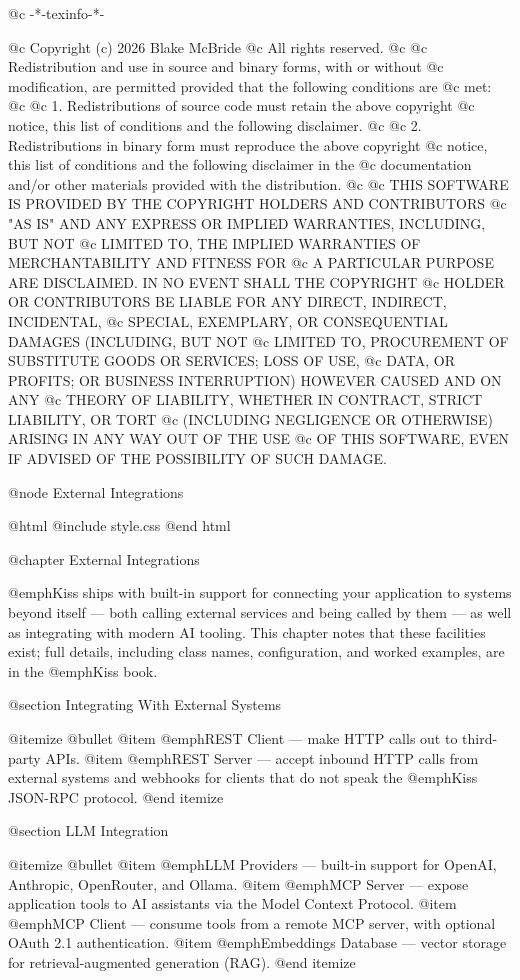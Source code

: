 @c -*-texinfo-*-

@c  Copyright (c) 2026 Blake McBride
@c  All rights reserved.
@c
@c  Redistribution and use in source and binary forms, with or without
@c  modification, are permitted provided that the following conditions are
@c  met:
@c
@c  1. Redistributions of source code must retain the above copyright
@c  notice, this list of conditions and the following disclaimer.
@c
@c  2. Redistributions in binary form must reproduce the above copyright
@c  notice, this list of conditions and the following disclaimer in the
@c  documentation and/or other materials provided with the distribution.
@c
@c  THIS SOFTWARE IS PROVIDED BY THE COPYRIGHT HOLDERS AND CONTRIBUTORS
@c  "AS IS" AND ANY EXPRESS OR IMPLIED WARRANTIES, INCLUDING, BUT NOT
@c  LIMITED TO, THE IMPLIED WARRANTIES OF MERCHANTABILITY AND FITNESS FOR
@c  A PARTICULAR PURPOSE ARE DISCLAIMED. IN NO EVENT SHALL THE COPYRIGHT
@c  HOLDER OR CONTRIBUTORS BE LIABLE FOR ANY DIRECT, INDIRECT, INCIDENTAL,
@c  SPECIAL, EXEMPLARY, OR CONSEQUENTIAL DAMAGES (INCLUDING, BUT NOT
@c  LIMITED TO, PROCUREMENT OF SUBSTITUTE GOODS OR SERVICES; LOSS OF USE,
@c  DATA, OR PROFITS; OR BUSINESS INTERRUPTION) HOWEVER CAUSED AND ON ANY
@c  THEORY OF LIABILITY, WHETHER IN CONTRACT, STRICT LIABILITY, OR TORT
@c  (INCLUDING NEGLIGENCE OR OTHERWISE) ARISING IN ANY WAY OUT OF THE USE
@c  OF THIS SOFTWARE, EVEN IF ADVISED OF THE POSSIBILITY OF SUCH DAMAGE.

@node External Integrations

@html
@include style.css
@end html

@chapter External Integrations

@emph{Kiss} ships with built-in support for connecting your application
to systems beyond itself --- both calling external services and being
called by them --- as well as integrating with modern AI tooling.  This
chapter notes that these facilities exist; full details, including
class names, configuration, and worked examples, are in the @emph{Kiss}
book.

@section Integrating With External Systems

@itemize @bullet
@item @emph{REST Client} --- make HTTP calls out to third-party APIs.
@item @emph{REST Server} --- accept inbound HTTP calls from external
systems and webhooks for clients that do not speak the @emph{Kiss}
JSON-RPC protocol.
@end itemize

@section LLM Integration

@itemize @bullet
@item @emph{LLM Providers} --- built-in support for OpenAI, Anthropic,
OpenRouter, and Ollama.
@item @emph{MCP Server} --- expose application tools to AI assistants
via the Model Context Protocol.
@item @emph{MCP Client} --- consume tools from a remote MCP server,
with optional OAuth 2.1 authentication.
@item @emph{Embeddings Database} --- vector storage for
retrieval-augmented generation (RAG).
@end itemize

